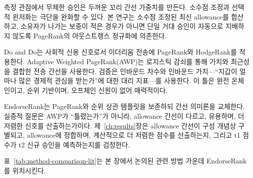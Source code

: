 측정 관점에서 무제한 승인은 두꺼운 꼬리 간선 가중치를 만든다. 소수점 조정과 선택적 윈저화는 극단을 완화할 수 있다. 본 연구는 소수점 조정된 최신 allowance를 합산하고, 소유자가 나가는 보증이 적은 경우가 아니면 단일 거대 승인이 자동으로 지배하지 않도록 PageRank의 아웃스트렝스 정규화에 의존한다.


Do and Do는 사회적 신용 신호로서 이더리움 전송에 PageRank와 HodgeRank를 적용한다. Adaptive Weighted PageRank(AWP)는 로지스틱 감쇠를 통해 가치와 최근성을 결합한 전송 간선을 사용한다. 검증은 인바운드 차수와 인바운드 가치---``지갑이 얼마나 많은 경제적 관심을 받는가''에 대한 대리 지표---를 사용한다. 이 틀은 완전 온체인이고, 순위 기반이며, 오프체인 신원이 없어 매력적이다.

EndorseRank는 PageRank와 순위 상관 템플릿을 보존하되 간선 의미론을 교체한다. 실증적 질문은 AWP가 ``틀렸는가''가 아니라, allowance 간선이 다르고, 유용하며, 더 저렴한 신호를 산출하는가이다. 제~\ref{ch:results}장은 allowance 간선이 구성 개념상 구별되고, allowance에 정합하며, 계산적으로 더 저렴한 점수를 산출하는지, 그리고 t1 점수가 t2 신규 승인을 예측하는지를 검정한다.


표~\ref{tab:method-comparison-lit}는 본 장에서 논의된 관련 방법 가운데 EndorseRank를 위치시킨다.

\begin{table}[htbp]
\centering
\caption{선택된 그래프 평판 방법의 비교(개념적).}
\label{tab:method-comparison-lit}
\end{table}

